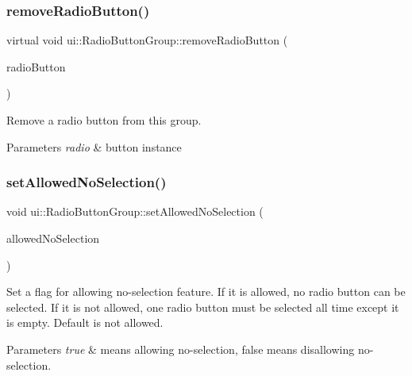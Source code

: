 \subsubsection{\texorpdfstring{remove\+Radio\+Button()}{removeRadioButton()}\hspace{0.1cm}{\footnotesize\ttfamily [2/2]}}
{\footnotesize\ttfamily virtual void ui\+::\+Radio\+Button\+Group\+::remove\+Radio\+Button (\begin{DoxyParamCaption}\item[{\hyperlink{classui_1_1RadioButton}{Radio\+Button} $\ast$}]{radio\+Button }\end{DoxyParamCaption})\hspace{0.3cm}{\ttfamily [virtual]}}

Remove a radio button from this group.


\begin{DoxyParams}{Parameters}
{\em radio} & button instance \\
\hline
\end{DoxyParams}
\mbox{\label{classui_1_1RadioButtonGroup_ac59b251d0cb6b439412172dd98cd9491}} 
\subsubsection{\texorpdfstring{set\+Allowed\+No\+Selection()}{setAllowedNoSelection()}\hspace{0.1cm}{\footnotesize\ttfamily [1/2]}}
{\footnotesize\ttfamily void ui\+::\+Radio\+Button\+Group\+::set\+Allowed\+No\+Selection (\begin{DoxyParamCaption}\item[{bool}]{allowed\+No\+Selection }\end{DoxyParamCaption})}

Set a flag for allowing no-\/selection feature. If it is allowed, no radio button can be selected. If it is not allowed, one radio button must be selected all time except it is empty. Default is not allowed.


\begin{DoxyParams}{Parameters}
{\em true} & means allowing no-\/selection, false means disallowing no-\/selection. \\
\hline
\end{DoxyParams}
\mbox{\label{classui_1_1RadioButtonGroup_ac59b251d0cb6b439412172dd98cd9491}} 
